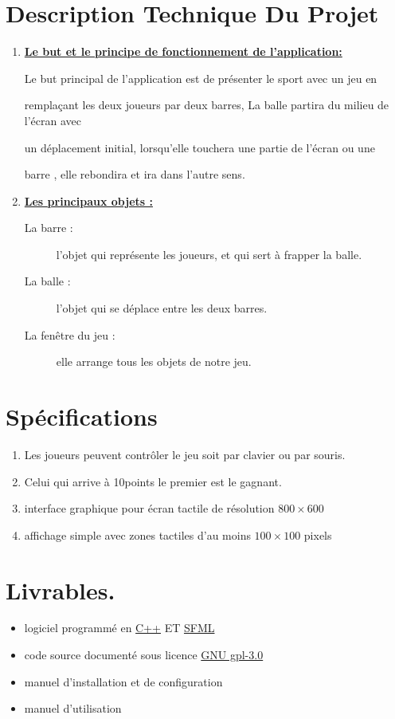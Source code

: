 \documentclass[a4paper,oneside]{article}
\begin{document}
 	\newpage
 	\section{Description Technique Du Projet}
 	\begin{enumerate}
 	\item	\textbf{ \underline{Le but et le principe de fonctionnement de l'application:}}
 		
 		
	 		Le but principal de l'application est de présenter le sport avec un jeu en
	 		
	 		remplaçant les deux joueurs par deux barres, La balle partira du milieu de l'écran avec
	 		
	 		un déplacement initial, lorsqu'elle touchera une partie de l'écran ou une
	 		
	 		barre , elle rebondira et ira dans l'autre sens.
	 		
		 \item \textbf{\underline{Les principaux objets :}}
		 \begin{description}
		 	\item[La barre : ]l'objet qui représente les joueurs, et qui sert à frapper la balle.
		 	\item[La balle : ]l'objet qui se déplace entre les deux barres.
		 	\item[La fenêtre du jeu :] elle arrange tous les objets de notre jeu.
		 \end{description}
	 		
 	\end{enumerate}
 	\section{Spécifications}
 	\begin{enumerate}
 		
  		\item Les joueurs peuvent contrôler le jeu soit par clavier ou par	souris.
  		\item Celui qui arrive à 10points le premier est le	gagnant.
  		\item interface graphique pour écran tactile de résolution $800 \times 600$
 		\item affichage simple avec zones tactiles d'au moins $100 \times 100$ pixels
 	
 	\end{enumerate}
 	\newpage
 	\appendix
 	\section{Livrables.}
 	\begin{itemize}
 		\item logiciel programmé en \href{https://fr.wikipedia.org/wiki/C\%2B\%2B}{C++} ET \href{http://www.sfml-dev.org/index-fr.php}{SFML} 
 		\item code source documenté sous licence \href{http://www.gnu.org/licenses/gpl-3.0.fr.html}{GNU gpl-3.0} 
 		\item manuel d'installation et de configuration
 		\item manuel d'utilisation
 	\end{itemize}
\end{document}
